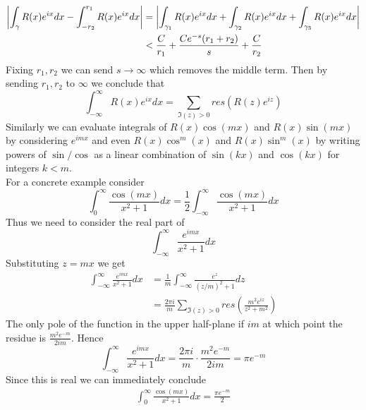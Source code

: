  \begin{align*}
     \left|\int_{\gamma} R(x) e^{ix} dx -  \int_{-r_2}^{r_1} R(x) e^{ix} dx\right| &= \left|\int_{\gamma_1} R(x) e^{ix} dx + \int_{\gamma_2} R(x) e^{ix} dx + \int_{\gamma_3} R(x) e^{ix} dx\right|\\
     &< \frac{C}{r_1} + \frac{Ce^{-s}(r_1 + r_2)}{s} + \frac{C}{r_2}
 \end{align*}
 Fixing $r_1, r_2$ we can send $s \to \infty$ which removes the middle term. Then by sending $r_1, r_2$ to $\infty$ we conclude that
 $$ \int_{-\infty}^{\infty} R(x) e^{ix} dx = \sum_{\Im(z) > 0} res(R(z)e^{iz}) $$
 Similarly we can evaluate integrals of $R(x)\cos(mx)$ and $R(x)\sin(mx)$ by considering $e^{imx}$ and even $R(x)\cos^m(x)$ and $R(x) \sin^m(x)$ by writing powers of $\sin/\cos$ as a linear combination of $\sin(kx)$ and $\cos(kx)$ for integers $k < m$.\\

 For a concrete example consider
 $$\int_0^{\infty} \frac{\cos(mx)}{x^2 + 1}dx = \frac{1}{2} \int_{-\infty}^{\infty} \frac{\cos(mx)}{x^2 + 1}dx$$
Thus we need to consider the real part of 
$$\int_{-\infty}^{\infty} \frac{e^{imx}}{x^2 + 1} dx$$
Substituting $z = mx$ we get
\begin{align*}
    \int_{-\infty}^{\infty} \frac{e^{imx}}{x^2 + 1}dx &= \frac{1}{m} \int_{-\infty}^{\infty} \frac{e^z}{(z/m)^2 + 1} dz\\
    &= \frac{2\pi i}{m} \sum_{\Im(z) > 0} res \left( \frac{m^2 e^{iz}}{z^2 + m^2} \right)
\end{align*}
The only pole of the function in the upper half-plane if $im$ at which point the residue is $\frac{m^2 e^{-m}}{2im}$. Hence
$$\int_{-\infty}^{\infty} \frac{e^{imx}}{x^2 + 1} dx = \frac{2\pi i}{m} \cdot \frac{m^2 e^{-m}}{2im} = \pi e^{-m} $$
Since this is real we can immediately conclude 
\begin{align*}
    \int_{0}^\infty \frac{\cos(mx)}{x^2 + 1}dx = \frac{\pi e^{-m}}{2}
\end{align*}

